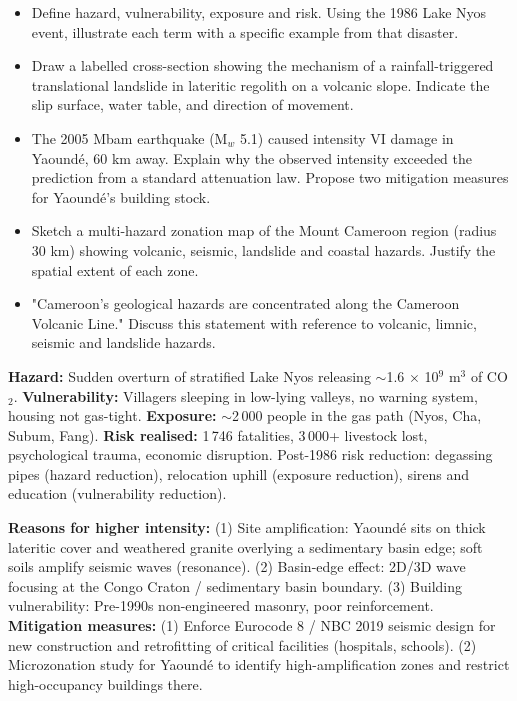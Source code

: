 \documentclass[11pt]{article}
\begin{document}
\begin{exercice}
\begin{itemize}
\item Define hazard, vulnerability, exposure and risk. Using the 1986 Lake Nyos event, illustrate each term with a specific example from that disaster.
\item Draw a labelled cross-section showing the mechanism of a rainfall-triggered translational landslide in lateritic regolith on a volcanic slope. Indicate the slip surface, water table, and direction of movement.
\item The 2005 Mbam earthquake (M$_w$ 5.1) caused intensity VI damage in Yaoundé, 60 km away. Explain why the observed intensity exceeded the prediction from a standard attenuation law. Propose two mitigation measures for Yaoundé's building stock.
\item Sketch a multi-hazard zonation map of the Mount Cameroon region (radius 30 km) showing volcanic, seismic, landslide and coastal hazards. Justify the spatial extent of each zone.
\item "Cameroon's geological hazards are concentrated along the Cameroon Volcanic Line." Discuss this statement with reference to volcanic, limnic, seismic and landslide hazards.
\end{itemize}
\end{exercice}

\begin{corrige}[Exercise 1]
\textbf{Hazard:} Sudden overturn of stratified Lake Nyos releasing $\sim$1.6 $\times$ 10$^9$ m$^3$ of CO$_2$. \textbf{Vulnerability:} Villagers sleeping in low-lying valleys, no warning system, housing not gas-tight. \textbf{Exposure:} $\sim$2\,000 people in the gas path (Nyos, Cha, Subum, Fang). \textbf{Risk realised:} 1\,746 fatalities, 3\,000+ livestock lost, psychological trauma, economic disruption. Post-1986 risk reduction: degassing pipes (hazard reduction), relocation uphill (exposure reduction), sirens and education (vulnerability reduction).
\end{corrige}

\begin{corrige}[Exercise 3]
\textbf{Reasons for higher intensity:} (1) Site amplification: Yaoundé sits on thick lateritic cover and weathered granite overlying a sedimentary basin edge; soft soils amplify seismic waves (resonance). (2) Basin-edge effect: 2D/3D wave focusing at the Congo Craton / sedimentary basin boundary. (3) Building vulnerability: Pre-1990s non-engineered masonry, poor reinforcement. \textbf{Mitigation measures:} (1) Enforce Eurocode 8 / NBC 2019 seismic design for new construction and retrofitting of critical facilities (hospitals, schools). (2) Microzonation study for Yaoundé to identify high-amplification zones and restrict high-occupancy buildings there.
\end{corrige}
\end{document}
